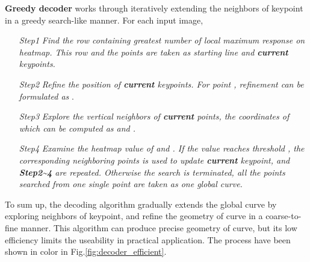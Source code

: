 \documentclass[final]{cvpr}
\begin{document}
\textbf{Greedy decoder} works through iteratively extending the neighbors of keypoint in a greedy search-like manner. For each input image,
\begin{itemize}[itemindent=1em]
    \item [\textsl{Step1}]
        \textsl{Find the row containing greatest number of local maximum response on heatmap. This row and the points are taken as starting line and \textbf{current} keypoints.}
    
    \item [\textsl{Step2}]
        \textsl{Refine the position of \textbf{current} keypoints. For point , refinement can be formulated as }.
    
    \item [\textsl{Step3}]
        \textsl{Explore the vertical neighbors of \textbf{current} points, the coordinates of which can be computed as  and . }
    
    \item [\textsl{Step4}]
        \textsl{Examine the heatmap value of  and . If the value reaches threshold , the corresponding neighboring points is used to update \textbf{current} keypoint, and \textbf{Step2\textasciitilde4} are repeated. Otherwise the search is terminated, all the points searched from one single point are taken as one global curve.}
    
\end{itemize}
To sum up, the decoding algorithm gradually extends the global curve by exploring neighbors of keypoint, and refine the geometry of curve in a coarse-to-fine manner. This algorithm can produce precise geometry of curve, but its low efficiency limits the useability in practical application.
The process have been shown in color in Fig.\ref{fig:decoder_efficient}.
\end{document}
